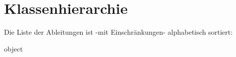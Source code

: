 \section{Klassenhierarchie}
Die Liste der Ableitungen ist -\/mit Einschränkungen-\/ alphabetisch sortiert\+:\begin{DoxyCompactList}
\item object\begin{DoxyCompactList}
\item {}
\item {}
\end{DoxyCompactList}
\end{DoxyCompactList}
